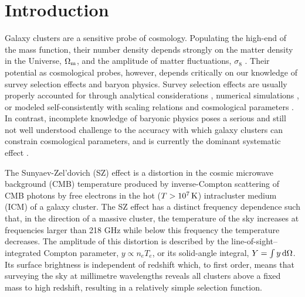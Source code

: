 
\pagebreak

\section{Introduction}\label{s:intro}


Galaxy clusters are a sensitive probe of cosmology. Populating the high-end of the mass function, their number density depends strongly on the matter density in the Universe, $\Omega_{\rm m}$, and the amplitude of matter fluctuations, $\sigma_8$ \citep[see, e.g., the review by][]{allen11}. Their potential as cosmological probes, however, depends critically on our knowledge of survey selection effects and baryon physics. Survey selection effects are usually properly accounted for through analytical considerations \citep[e.g.,][]{vikhlinin09_cosmo}, numerical simulations \citep[e.g.,][]{sehgal11,sifon13}, or modeled self-consistently with scaling relations and cosmological parameters \citep[e.g.,][]{pacaud07,mantz10,rozo10,benson13,hasselfield13,bocquet15}. In contrast, incomplete knowledge of baryonic physics poses a serious and still not well understood challenge to the accuracy with which galaxy clusters can constrain cosmological parameters, and is currently the dominant systematic effect \citep[e.g.,][]{benson13,hasselfield13}.

The Sunyaev-Zel'dovich (SZ) effect \citep{zeldovich69,sunyaev80} is a distortion in the cosmic microwave background (CMB) temperature produced by inverse-Compton scattering of CMB photons by free electrons in the hot ($T>10^7\,{\rm K}$) intracluster medium (ICM) of a galaxy cluster. The SZ effect has a distinct frequency dependence such that, in the direction of a massive cluster, the temperature of the sky increases at frequencies larger than 218 GHz while below this frequency the temperature decreases. The amplitude of this distortion is described by the line-of-sight--integrated Compton parameter, $y\propto n_eT_e$, or its solid-angle integral, $Y=\int y\,{\rm d}\Omega$. Its surface brightness is independent of redshift which, to first order, means that surveying the sky at millimetre wavelengths reveals all clusters above a fixed mass to high redshift, resulting in a relatively simple selection function.

